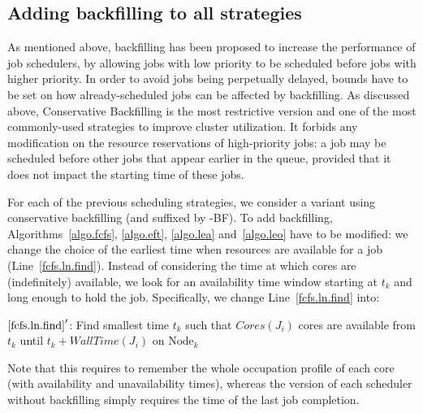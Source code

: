 \documentclass[conference,10pt]{IEEEtran}
\newcommand{\Node}[1]{\ensuremath{\mathrm{Node}_{#1}}\xspace}
\newcommand{\core}{\mathit{Cores}\xspace}
\newcommand{\walltime}{\mathit{WallTime}\xspace}
\begin{document}
\subsection{Adding backfilling to all strategies}

As mentioned above, backfilling has been proposed to increase the
performance of job schedulers, by allowing jobs with low priority to be
scheduled before jobs with higher priority.
In order to avoid jobs
being perpetually delayed, bounds have to be set on how already-scheduled
jobs can be affected by backfilling. As discussed above,
Conservative Backfilling is the most restrictive version and one of
the most commonly-used strategies to improve cluster utilization. It
forbids any modification on the resource
reservations of high-priority jobs: a job may be scheduled
before other jobs that appear earlier in the queue, provided that it
does not impact the starting time of these jobs.


For each of the previous scheduling strategies, we consider a variant
using conservative backfilling (and suffixed by -BF).  To add
backfilling, Algorithms~\ref{algo.fcfs}, \ref{algo.eft},
\ref{algo.lea} and~\ref{algo.leo} have to be modified: we change the
choice of the earliest time when resources are available for a job
(Line~\ref{fcfs.ln.find}). Instead of considering the time at which
cores are (indefinitely) available, we look for an availability time
window starting at $t_k$ and long enough to hold the
job. Specifically, we change Line~\ref{fcfs.ln.find} into:
\begin{algorithmic}[0]
  \State $\ref{fcfs.ln.find}'$: Find smallest time $t_k$ such that $\core(J_i)$ cores are
  available from $t_k$ until $t_k + \walltime(J_i)$ on $\Node{k}$
\end{algorithmic}

Note that this requires to remember the whole occupation profile of
each core (with availability and unavailability times), whereas the
version of each scheduler without backfilling simply requires the time
of the last job completion.


\end{document}
